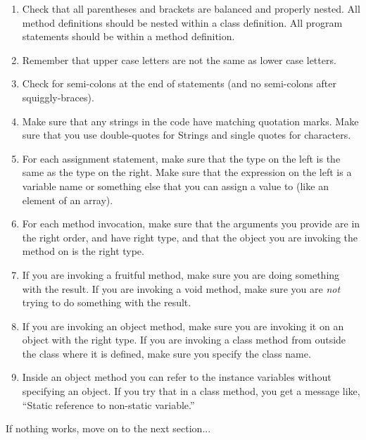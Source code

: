 \documentclass[12pt]{book}
\theoremstyle{definition}
\begin{document}
\begin{enumerate}

\item Check that all parentheses and brackets are
balanced and properly nested.  All method definitions should be nested
within a class definition.  All program statements should be within a
method definition.

\item Remember that upper case letters are not the same as
lower case letters.

\item Check for semi-colons at the end of statements (and
no semi-colons after squiggly-braces).

\item Make sure that any strings in the code have matching
quotation marks.  Make sure that you use double-quotes for
Strings and single quotes for characters.

\item For each assignment statement, make sure that the type
on the left is the same as the type on the right.  Make sure
that the expression on the left is a variable name or something
else that you can assign a value to (like an element of an array).

\item For each method invocation, make sure that the arguments
you provide are in the right order, and have right type, and that the
object you are invoking the method on is the right type.

\item If you are invoking a fruitful method, make sure you
are doing something with the result.  If you are invoking a
void method, make sure you are {\em not} trying to do something
with the result.

\item If you are invoking an object method, make sure you are
invoking it on an object with the right type.  If you are invoking
a class method from outside the class where it is defined, make
sure you specify the class name.

\item Inside an object method you can refer to the instance
variables without specifying an object.  If you try that in
a class method, you get a message like, ``Static
reference to non-static variable.''

\end{enumerate}

If nothing works, move on to the next section...
\end{document}
